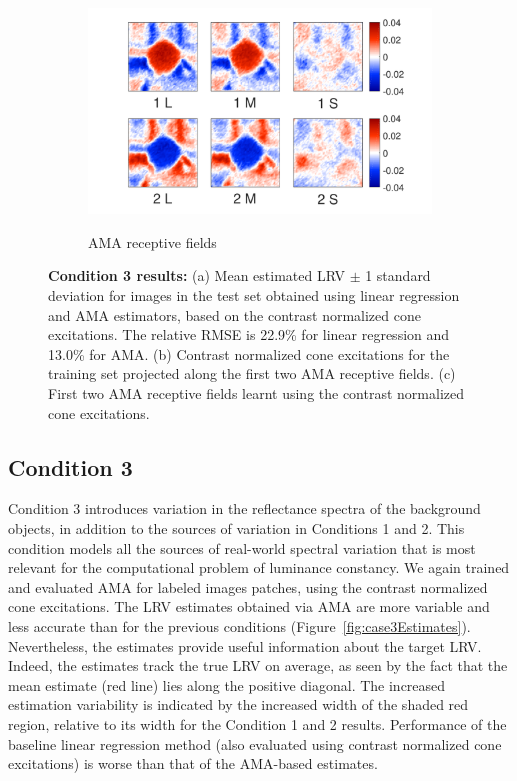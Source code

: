\documentclass{jov}
\begin{document}
\begin{figure}
\begin{subfigure}[b]{0.26\textwidth}
        \label{fig:case3RFResponse}
    \end{subfigure}
    \begin{subfigure}[b]{0.4 \textwidth}
	\caption{AMA receptive fields}
	\includegraphics[width=1.0\textwidth, trim={0.2cm -0.cm 0 0.3cm}]{../FiguresDraft5/Figure12/Figure12_c.pdf}
	\label{fig:case3RFs}
    \end{subfigure}
    \caption{{\bf Condition 3 results:} (a) Mean estimated LRV $\pm$ 1 standard deviation for images in the test set obtained using linear regression and AMA estimators, based on the contrast normalized cone excitations. The relative RMSE is 22.9\%  for linear regression and 13.0\% for AMA. (b) Contrast normalized cone excitations for the training set projected along the first two AMA receptive fields. (c) First two AMA receptive fields learnt using the contrast normalized cone excitations.}
\label{fig:Condition3}
\end{figure}

\subsection{Condition 3}

Condition 3 introduces variation in the reflectance spectra of the background objects, in addition to the sources of variation in Conditions 1 and 2.
This condition models all the sources of real-world spectral variation that is most relevant for the computational problem of luminance constancy.
We again trained and evaluated AMA for labeled images patches, using the contrast normalized cone excitations.
The LRV estimates obtained via AMA are more variable and less accurate than for the previous conditions (Figure~\ref{fig:case3Estimates}).
Nevertheless, the estimates provide useful information about the target LRV.
Indeed, the estimates track the true LRV on average, as seen by the fact that the mean estimate (red line) lies along the positive diagonal.
The increased estimation variability is indicated by the increased width of the shaded red region, relative to its width for the Condition 1 and 2 results.
Performance of the baseline linear regression method (also evaluated using contrast normalized cone excitations) is worse than that of the AMA-based estimates.
\end{document}
